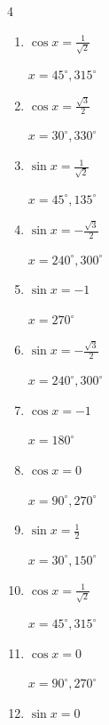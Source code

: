 \begin{multicols}{4}
\begin{enumerate}
        $\displaystyle x = 150^{\circ} , 330^{\circ}$

  \item $\displaystyle \cos{x}  = \frac{1}{\sqrt{2}}$

        $\displaystyle x = 45^{\circ} , 315^{\circ}$

  \item $\displaystyle \cos{x}  = \frac{\sqrt{3}}{2}$

        $\displaystyle x = 30^{\circ} , 330^{\circ}$

  \item $\displaystyle \sin{x}  = \frac{1}{\sqrt{2}}$

        $\displaystyle x = 45^{\circ} , 135^{\circ}$

  \item $\displaystyle \sin{x}  = -\frac{\sqrt{3}}{2}$

        $\displaystyle x = 240^{\circ} , 300^{\circ}$

\columnbreak %

  \item $\displaystyle \sin{x}  = -1$

        $\displaystyle x = 270^{\circ}$

  \item $\displaystyle \sin{x}  = -\frac{\sqrt{3}}{2}$

        $\displaystyle x = 240^{\circ} , 300^{\circ}$

  \item $\displaystyle \cos{x}  = -1$

        $\displaystyle x = 180^{\circ}$

  \item $\displaystyle \cos{x}  = 0$

        $\displaystyle x = 90^{\circ} , 270^{\circ}$

  \item $\displaystyle \sin{x}  = \frac{1}{2}$

        $\displaystyle x = 30^{\circ} , 150^{\circ}$

  \item $\displaystyle \cos{x}  = \frac{1}{\sqrt{2}}$

        $\displaystyle x = 45^{\circ} , 315^{\circ}$

  \item $\displaystyle \cos{x}  = 0$

        $\displaystyle x = 90^{\circ} , 270^{\circ}$

  \item $\displaystyle \sin{x}  = 0$


\end{enumerate}
\end{multicols}
